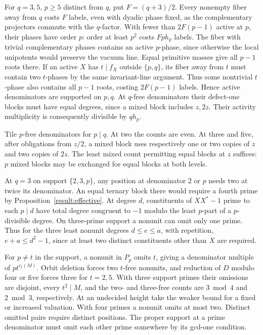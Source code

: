\documentclass[11pt]{amsart}
\numberwithin{equation}{section}
\theoremstyle{definition}
\theoremstyle{plain}
\begin{document}
For $q=3,5$, $p\ge5$ distinct from $q$, put $F=(q+3)/2$.
Every nonempty fiber away from $q$ costs $F$ labels, even with dyadic
phase fixed, as the complementary projectors commute with the $q$-factor.
With fewer than $2F(p-1)$ active at $p$, their phases have order $p$:
order at least $p^2$ costs $Fph_p$ labels. The fiber with trivial
complementary phases contains an active $p$-phase, since otherwise the
local unipotents would preserve the vacuum line. Equal primitive masses
give all $p-1$ roots there. If an active $X$ has $t\mid f_X$ outside
$\{p,q\}$, its fiber away from $t$ must contain two $t$-phases by the
same invariant-line argument. Thus some nontrivial $t$-phase also contains
all $p-1$ roots, costing $2F(p-1)$ labels. Hence active denominators are
supported on $p,q$. At $q$-free denominators their defect-one blocks must
have equal degrees, since a mixed block includes $z,2z$. Their activity
multiplicity is consequently divisible by $qh_p$.

Tile $p$-free denominators for $p\mid q$. At two the counts are even.
At three and five, after obligations from $z/2$, a mixed block uses
respectively one or two copies of $z$ and two copies of $2z$.
The least mixed count permitting equal blocks at $z$ suffices: $p$
mixed blocks may be exchanged for equal blocks at both levels.

At $q=3$ on support $\{2,3,p\}$, any position at denominator $2$ or
$p$ needs two at twice its denominator. An equal ternary block there
would require a fourth prime by Proposition~\ref{result:effective}.
At degree $d$, constituents of $XX^*-1$ prime to each $p\mid d$
have total degree congruent to $-1$ modulo the least $p$-part of a
$p$-divisible degree. On three-prime support a nonunit can omit only
one prime. Thus for the three least nonunit degrees $d\le e\le a$,
with repetition, $e+a\le d^2-1$, since at least two distinct
constituents other than $X$ are required.

For $p\ne t$ in the support, a nonunit in $P_p$ omits $t$, giving a
denominator multiple of $pt^{v_t(M)}$. Orbit deletion forces two
$t$-free nonunits, and reduction of $D$ modulo four or five forces
three for $t=2,5$. With three support primes their omissions are
disjoint, every $t^2\mid M$, and the two- and three-free counts are
$3\bmod4$ and $2\bmod3$, respectively. At an undecided height take
the weaker bound for a fixed or increased valuation. With four
primes a nonunit omits at most two. Distinct omitted pairs require
distinct positions. The proper support at a prime denominator must
omit each other prime somewhere by its gcd-one condition.
\end{document}
